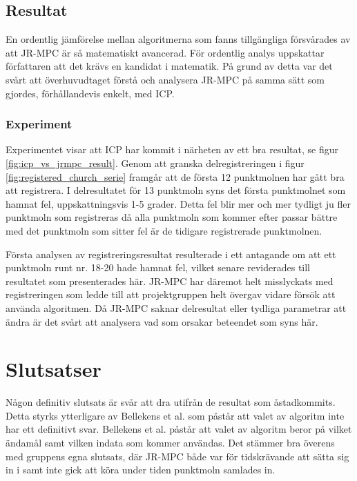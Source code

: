 \subsection{Resultat}

En ordentlig jämförelse mellan algoritmerna som fanns tillgängliga försvårades av att JR-MPC är så matematiskt avancerad. För ordentlig analys uppskattar författaren att det krävs en kandidat i matematik. På grund av detta var det svårt att överhuvudtaget förstå och analysera JR-MPC på samma sätt som gjordes, förhållandevis enkelt, med ICP.


\subsubsection{Experiment}

Experimentet visar att ICP har kommit i närheten av ett bra resultat, se figur \ref{fig:icp_vs_jrmpc_result}. Genom att granska delregistreringen i figur \ref{fig:registered_church_serie} framgår att de första 12 punktmolnen har gått bra att registrera. I delresultatet för 13 punktmoln syns det första punktmolnet som hamnat fel, uppskattningsvis 1-5 grader. Detta fel blir mer och mer tydligt ju fler punktmoln som registreras då alla punktmoln som kommer efter passar bättre med det punktmoln som sitter fel är de tidigare registrerade punktmolnen. 

Första analysen av registreringsresultat resulterade i ett antagande om att ett punktmoln runt nr. 18-20 hade hamnat fel, vilket senare reviderades till resultatet som presenterades här. JR-MPC har däremot helt misslyckats med registreringen som ledde till att projektgruppen helt övergav vidare försök att använda algoritmen. Då JR-MPC saknar delresultat eller tydliga parametrar att ändra är det svårt att analysera vad som orsakar beteendet som syns här.

\section{Slutsatser}
\label{sec:conclusions-karlsson}

Någon definitiv slutsats är svår att dra utifrån de resultat som åstadkommits. Detta styrks ytterligare av Bellekens et al. \cite{registration_comparing} som påstår att valet av algoritm inte har ett definitivt svar. Bellekens et al. påstår att valet av algoritm beror på vilket ändamål samt vilken indata som kommer användas. Det stämmer bra överens med gruppens egna slutsats, där JR-MPC både var för tidskrävande att sätta sig in i samt inte gick att köra under tiden punktmoln samlades in.

